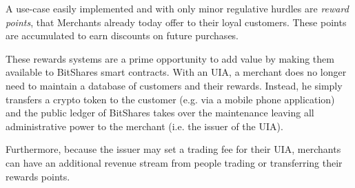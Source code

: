 A use-case easily implemented and with only minor regulative hurdles are
\emph{reward points}, that Merchants already today offer to their loyal
customers. These points are accumulated to earn discounts on future purchases.

These rewards systems are a prime opportunity to add value by making them
available to BitShares smart contracts. With an UIA, a merchant does no longer
need to maintain a database of customers and their rewards. Instead, he simply
transfers a crypto token to the customer (e.g. via a mobile phone application)
and the public ledger of BitShares takes over the maintenance leaving all
administrative power to the merchant (i.e. the issuer of the UIA).

Furthermore, because the issuer may set a trading fee for their UIA, merchants
can have an additional revenue stream from people trading or transferring their
rewards points.
